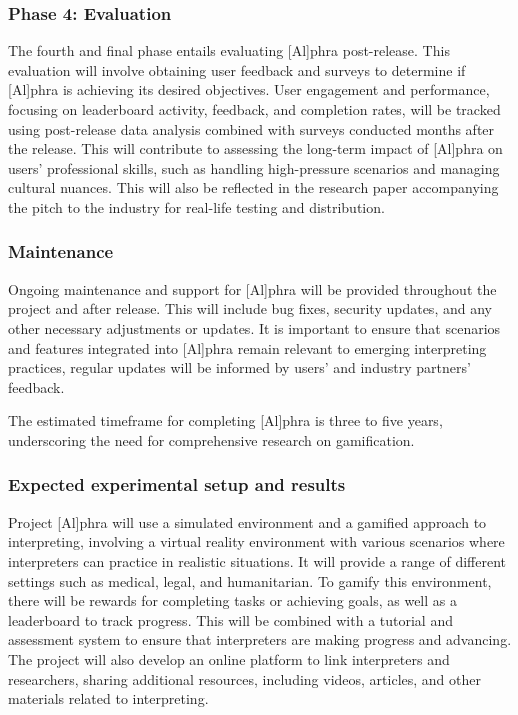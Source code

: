 \documentclass[output=paper]{langscibook}
\begin{document}
\subsubsection{Phase 4: Evaluation}

The fourth and final phase entails evaluating [Al]phra post-release. This evaluation will involve obtaining user feedback and surveys to determine if [Al]phra is achieving its desired objectives. User engagement and performance, focusing on leaderboard activity, feedback, and completion rates, will be tracked using post-release data analysis combined with surveys conducted months after the release. This will contribute to assessing the long-term impact of [Al]phra on users’ professional skills, such as handling high-pressure scenarios and managing cultural nuances. This will also be reflected in the research paper accompanying the pitch to the industry for real-life testing and distribution.~

\subsubsection{Maintenance}
Ongoing maintenance and support for [Al]phra will be provided throughout the project and after release. This will include bug fixes, security updates, and any other necessary adjustments or updates. It is important to ensure that scenarios and features integrated into [Al]phra remain relevant to emerging interpreting practices, regular updates will be informed by users’ and industry partners’ feedback. 

The estimated timeframe for completing [Al]phra is three to five years, underscoring the need for comprehensive research on gamification.

\subsubsection{Expected experimental setup and results}

Project [Al]phra will use a simulated environment and a gamified approach to interpreting, involving a virtual reality environment with various scenarios where interpreters can practice in realistic situations. It will provide a range of different settings such as medical, legal, and humanitarian. To gamify this environment, there will be rewards for completing tasks or achieving goals, as well as a leaderboard to track progress. This will be combined with a tutorial and assessment system to ensure that interpreters are making progress and advancing. The project will also develop an online platform to link interpreters and researchers, sharing additional resources, including videos, articles, and other materials related to interpreting.
\end{document}
